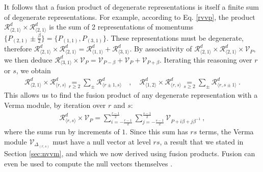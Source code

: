 \documentclass[12pt, a4paper]{article}
\theoremstyle{break}
\begin{document}
It follows that a fusion product of degenerate representations is itself a finite sum of degenerate representations. 
For example, according to Eq. \eqref{rvvp}, the product $\mathcal{R}^d_{\langle 2,1\rangle}\times\mathcal{R}^d_{\langle 2,1\rangle}$ is the sum of 2 representations of momentums $\{P_{(2,1)} \pm \frac{\beta}{2}\} = \{P_{(1,1)},P_{(3,1)}\}$. These representations must be degenerate, therefore $\mathcal{R}^d_{\langle 2,1\rangle}\times\mathcal{R}^d_{\langle 2,1\rangle}=\mathcal{R}^d_{\langle 1,1\rangle}+\mathcal{R}^d_{\langle 3,1\rangle}$. By associativity of $\mathcal{R}^d_{\langle 2,1\rangle}\times\mathcal{R}^d_{\langle 2,1\rangle}\times \mathcal{V}_P$, we then deduce 
$
 \mathcal{R}^d_{\langle 3,1\rangle} \times \mathcal{V}_P = \mathcal{V}_{P-\beta}+\mathcal{V}_P+\mathcal{V}_{P+\beta}
$. Iterating this reasoning over $r$ or $s$, we obtain 
\begin{align}
 \mathcal{R}^d_{\langle 2,1\rangle}\times \mathcal{R}^d_{\langle r,s\rangle} 
 \underset{r\geq 2}{=} \sum_\pm \mathcal{R}^d_{\langle r\pm 1,s\rangle} 
 \quad , \quad 
 \mathcal{R}^d_{\langle 1,2\rangle}\times \mathcal{R}^d_{\langle r,s\rangle} 
 \underset{s\geq 2}{=}\sum_\pm \mathcal{R}^d_{\langle r,s\pm 1\rangle} \ .
 \label{rrrs}
\end{align}
This allows us to find the fusion product of any degenerate representation with a Verma module, by iteration over $r$ and $s$:
\begin{align}
 \boxed{\mathcal{R}^d_{\langle r,s\rangle}\times \mathcal{V}_P = \sum_{i=-\frac{r-1}{2}}^{\frac{r-1}{2}} \sum_{j=-\frac{s-1}{2}}^{\frac{s-1}{2}} \mathcal{V}_{P+i\beta +j\beta^{-1}}}\ ,
 \label{rrsvp}
\end{align}
where the sums run by increments of $1$. Since this sum has $rs$ terms, the Verma module $\mathcal{V}_{\Delta_{(r,s)}}$ must have a null vector at level $rs$, a result that we stated in Section \ref{sec:nvvm}, and which we now derived using fusion products. Fusion can even be used to compute the null vectors themselves \cite{fms97}. 
\end{document}
